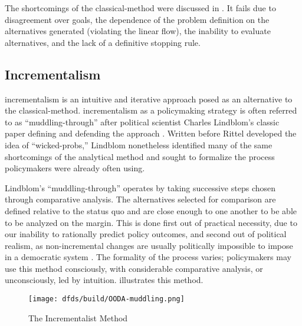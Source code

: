 The shortcomings of the \ac{classical-method} were discussed in . It fails due to
disagreement over goals, the dependence of the problem definition on the alternatives generated (violating the linear
flow), the inability to evaluate alternatives, and the lack of a definitive stopping rule.

\subsection{Incrementalism}

\Ac{incrementalism} is an intuitive and iterative approach posed as an alternative to the \ac{classical-method}.
\Ac{incrementalism} as a policymaking strategy is often referred to as ``\ac{muddling-through}'' after political
scientist Charles Lindblom's classic paper defining and defending the approach \cite{lindblom_muddling_1959}. Written
before Rittel developed the idea of ``\acp{wicked-prob},'' Lindblom nonetheless identified many of the same shortcomings
of the analytical method and sought to formalize the process policymakers were already often using.

Lindblom's ``\ac{muddling-through}'' operates by taking successive steps chosen through comparative analysis. The
alternatives selected for comparison are defined relative to the status quo and are close enough to one another to be
able to be analyzed on the margin. This is done first out of practical necessity, due to our inability to rationally
predict policy outcomes, and second out of political realism, as non-incremental changes are usually politically
impossible to impose in a democratic system \cite{lindblom_muddling_1959}. The formality of the process varies;
policymakers may use this method consciously, with considerable comparative analysis, or unconsciously, led by
intuition.  illustrates this method.


\begin{figure}[h]
  \centering\CaptionFontSize
  \texttt{[image: dfds/build/OODA-muddling.png]}
  \caption[The Incrementalist Method]{The Incrementalist Method}
  \label{fig-muddling-through}
\end{figure}

